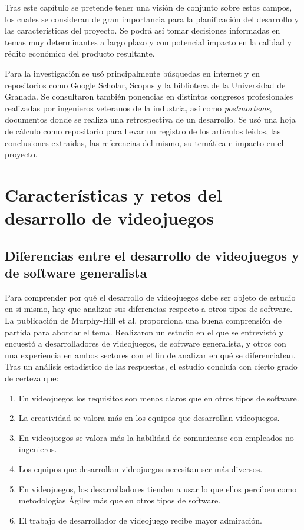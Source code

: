 Tras este capítulo se pretende tener una visión de conjunto sobre estos campos, los cuales se consideran de gran importancia para la planificación del desarrollo y las características del proyecto. Se podrá así tomar decisiones informadas en temas muy determinantes a largo plazo y con potencial impacto en la calidad y rédito económico del producto resultante.


Para la investigación se usó principalmente búsquedas en internet y en repositorios como Google Scholar, Scopus y la biblioteca de la Universidad de Granada. Se consultaron también ponencias en distintos congresos profesionales realizadas por ingenieros veteranos de la industria, así como \textit{postmortems}, documentos donde se realiza una retrospectiva de un desarrollo. Se usó una hoja de cálculo como repositorio para llevar un registro de los artículos leidos, las conclusiones extraidas, las referencias del mismo, su temática e impacto en el proyecto.

\section{Características y retos del desarrollo de videojuegos}

\subsection{Diferencias entre el desarrollo de videojuegos y de software generalista}

Para comprender por qué el desarrollo de videojuegos debe ser objeto de estudio en si mismo, hay que analizar sus diferencias respecto a otros tipos de software. La publicación de Murphy-Hill et al.\cite{murphy-hill} proporciona una buena comprensión de partida para abordar el tema. Realizaron un estudio en el que se entrevistó y encuestó a desarrolladores de videojuegos, de software generalista, y otros con una experiencia en ambos sectores con el fin de analizar en qué se diferenciaban. Tras un análisis estadístico de las respuestas, el estudio concluía con cierto grado de certeza que:

\begin{enumerate}
    \item En videojuegos los requisitos son menos claros que en otros tipos de software.
    \item La creatividad se valora más en los equipos que desarrollan videojuegos.
    \item En videojuegos se valora más la habilidad de comunicarse con empleados no ingenieros.
    \item Los equipos que desarrollan videojuegos necesitan ser más diversos.
    \item En videojuegos, los desarrolladores tienden a usar lo que ellos perciben como metodologías Ágiles más que en otros tipos de software.
    \item El trabajo de desarrollador de videojuego recibe mayor admiración. 
\end{enumerate}

